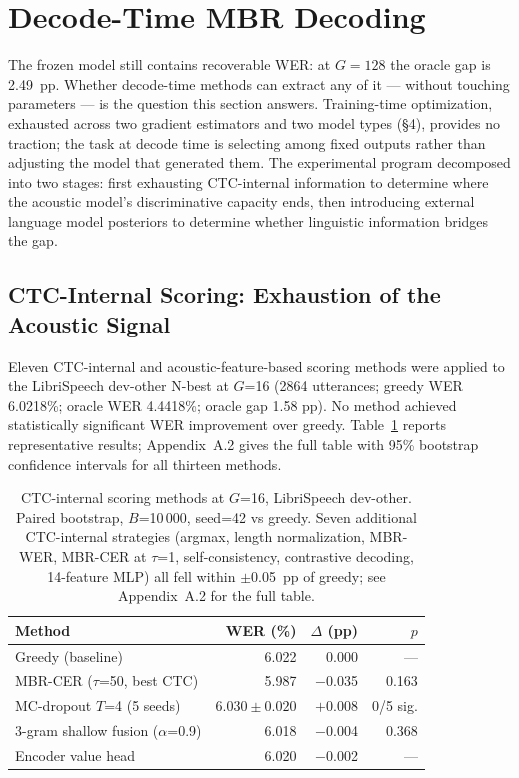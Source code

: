 \section{Decode-Time MBR Decoding}
\label{sec:decoding}

The frozen model still contains recoverable WER: at $G=128$ the oracle gap is 2.49~pp. Whether
decode-time methods can extract any of it — without touching parameters — is the question this
section answers. Training-time optimization, exhausted across two gradient estimators and two model types
(§4), provides no traction; the task at decode time is selecting among fixed outputs rather than adjusting the model
that generated them. The experimental program decomposed into two stages: first exhausting
CTC-internal information to determine where the acoustic model's discriminative capacity ends, then introducing external
language model posteriors to determine whether linguistic information bridges the gap.



\subsection{CTC-Internal Scoring: Exhaustion of the Acoustic Signal}
\label{sec:exhaustion}

Eleven CTC-internal and acoustic-feature-based scoring methods were applied to the LibriSpeech
dev-other N-best at $G$=16 (2864 utterances; greedy WER 6.0218\%; oracle WER 4.4418\%; oracle gap
1.58 pp). No method achieved statistically significant WER improvement over greedy. Table~\ref{tab:ctc-internal} reports representative results; Appendix~A.2 gives the full table with 95\% bootstrap confidence intervals for all thirteen methods.

\begin{table}[t]
\centering
\caption{CTC-internal scoring methods at $G$=16, LibriSpeech dev-other.
Paired bootstrap, $B$=10\,000, seed=42 vs greedy. Seven additional CTC-internal strategies (argmax, length normalization, MBR-WER, MBR-CER at $\tau$=1, self-consistency, contrastive decoding, 14-feature MLP) all fell within $\pm$0.05~pp of greedy; see Appendix~A.2 for the full table.}
\label{tab:ctc-internal}
\begin{tabular}{lrrr}
\hline
Method & WER (\%) & $\Delta$ (pp) & $p$ \\
\hline
Greedy (baseline) & 6.022 & 0.000 & --- \\
MBR-CER ($\tau$=50, best CTC) & 5.987 & $-$0.035 & 0.163 \\
MC-dropout $T$=4 (5 seeds) & $6.030 \pm 0.020$ & $+$0.008 & 0/5 sig. \\
3-gram shallow fusion ($\alpha$=0.9) & 6.018 & $-$0.004 & 0.368 \\
Encoder value head & 6.020 & $-$0.002 & --- \\
\hline
\end{tabular}
\end{table}

